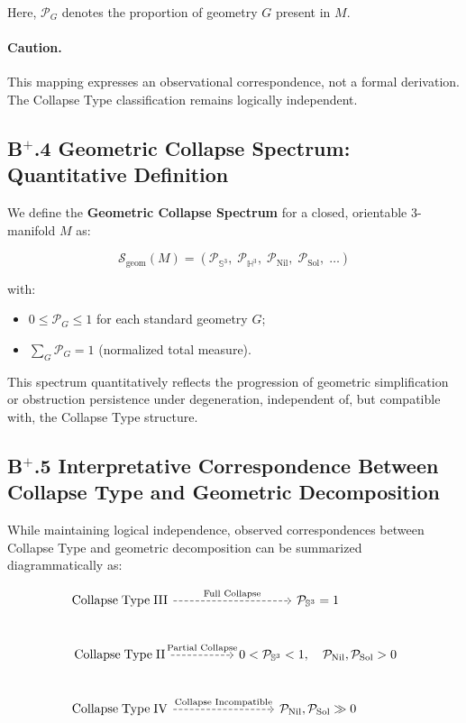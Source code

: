 \documentclass[11pt]{article}
\begin{document}
Here, $\mathcal{P}_G$ denotes the proportion of geometry $G$ present in $M$.

\paragraph{Caution.} This mapping expresses an observational correspondence, not a formal derivation. The Collapse Type classification remains logically independent.

\subsection*{B$^{+}$.4 Geometric Collapse Spectrum: Quantitative Definition}

We define the \textbf{Geometric Collapse Spectrum} for a closed, orientable $3$-manifold $M$ as:

\[
\mathcal{S}_{\mathrm{geom}}(M) = \left( \mathcal{P}_{\mathbb{S}^3},\; \mathcal{P}_{\mathbb{H}^3},\; \mathcal{P}_{\mathrm{Nil}},\; \mathcal{P}_{\mathrm{Sol}},\; \ldots \right)
\]

with:

\begin{itemize}
    \item $0 \leq \mathcal{P}_G \leq 1$ for each standard geometry $G$;
    \item $\sum_G \mathcal{P}_G = 1$ (normalized total measure).
\end{itemize}

This spectrum quantitatively reflects the progression of geometric simplification or obstruction persistence under degeneration, independent of, but compatible with, the Collapse Type structure.

\subsection*{B$^{+}$.5 Interpretative Correspondence Between Collapse Type and Geometric Decomposition}

While maintaining logical independence, observed correspondences between Collapse Type and geometric decomposition can be summarized diagrammatically as:

\[
\begin{tikzcd}[column sep=huge, row sep=large]
\mathrm{Collapse\;Type\;III} \arrow[r, dashed, "\text{Full Collapse}"]
& \mathcal{P}_{\mathbb{S}^3} = 1 \\
\mathrm{Collapse\;Type\;II} \arrow[r, dashed, "\text{Partial Collapse}"]
& 0 < \mathcal{P}_{\mathbb{S}^3} < 1,\quad \mathcal{P}_{\mathrm{Nil}},\mathcal{P}_{\mathrm{Sol}} > 0 \\
\mathrm{Collapse\;Type\;IV} \arrow[r, dashed, "\text{Collapse Incompatible}"]
& \mathcal{P}_{\mathrm{Nil}},\mathcal{P}_{\mathrm{Sol}} \gg 0
\end{tikzcd}
\]
\end{document}
